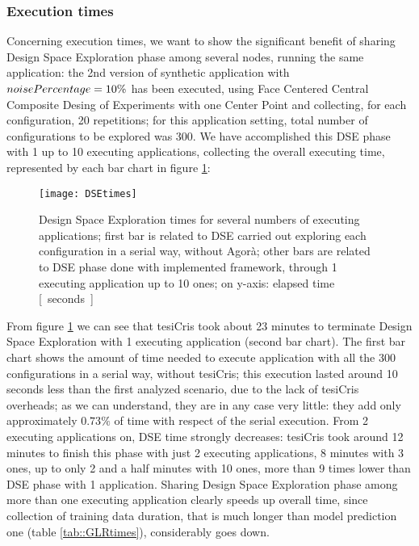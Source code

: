 \subsubsection{Execution times}

Concerning execution times, we want to show the significant benefit of sharing Design Space Exploration phase among several nodes, running the same application: the 2nd version of synthetic application with $noise\-Percentage = 10\%$ has been executed, using Face Centered Central Composite Desing of Experiments with one Center Point and collecting, for each configuration, 20 repetitions; for this application setting, total number of configurations to be explored was 300. We have accomplished this DSE phase with 1 up to 10 executing applications, collecting the overall executing time, represented by each bar chart in figure \ref{fig::DSEtimes}:

\begin{figure}[H]

    \centering
    \texttt{[image: DSEtimes]}
    \caption{Design Space Exploration times for several numbers of executing applications; first bar is related to DSE carried out exploring each configuration in a serial way, without Agorà; other bars are related to DSE phase done with implemented framework, through 1 executing application up to 10 ones; on y-axis: elapsed time \hbox{[ seconds ]}}
    \label{fig::DSEtimes}
    
\end{figure}

From figure \ref{fig::DSEtimes} we can see that tesiCris took about 23 minutes to terminate Design Space Exploration with 1 executing application (second bar chart). The first bar chart shows the amount of time needed to execute application with all the 300 configurations in a serial way, without tesiCris; this execution lasted around 10 seconds less than the first analyzed scenario, due to the lack of tesiCris overheads; as we can understand, they are in any case very little: they add only approximately $0.73\%$ of time with respect of the serial execution. From 2 executing applications on, DSE time strongly decreases: tesiCris took around 12 minutes to finish this phase with just 2 executing applications, 8 minutes with 3 ones, up to only 2 and a half minutes with 10 ones, more than 9 times lower than DSE phase with 1 application. Sharing Design Space Exploration phase among more than one executing application clearly speeds up overall time, since collection of training data duration, that is much longer than model prediction one (table \ref{tab::GLRtimes}), considerably goes down.

